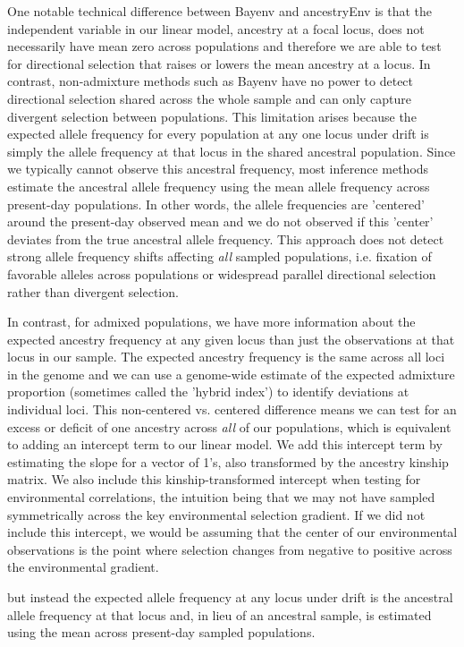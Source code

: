 \documentclass[12pt]{report}
\begin{document}
One notable technical difference between Bayenv and ancestryEnv is that the independent variable in our linear model, ancestry at a focal locus, does not necessarily have mean zero across populations and therefore we are able to test for directional selection that raises or lowers the mean ancestry at a locus. In contrast, non-admixture methods such as Bayenv have no power to detect directional selection shared across the whole sample and can only capture divergent selection between populations. This limitation arises because the expected allele frequency for every population at any one locus under drift is simply the allele frequency at that locus in the shared ancestral population. Since we typically cannot observe this ancestral frequency, most inference methods estimate the ancestral allele frequency using the mean allele frequency across present-day populations. In other words, the allele frequencies are 'centered' around the present-day observed mean and we do not observed if this 'center' deviates from the true ancestral allele frequency. This approach does not detect strong allele frequency shifts affecting \textit{all} sampled populations, i.e. fixation of favorable alleles across populations or widespread parallel directional selection rather than divergent selection.

In contrast, for admixed populations, we have more information about the expected ancestry frequency at any given locus than just the observations at that locus in our sample. The expected ancestry frequency is the same across all loci in the genome and we can use a genome-wide estimate of the expected admixture proportion (sometimes called the 'hybrid index') to identify deviations at individual loci. This non-centered vs. centered difference means we can test for an excess or deficit of one ancestry across \textit{all} of our populations, which is equivalent to adding an intercept term to our linear model. We add this intercept term by estimating the slope for a vector of 1's, also transformed by the ancestry kinship matrix. We also include this kinship-transformed intercept when testing for environmental correlations, the intuition being that we may not have sampled symmetrically across the key environmental selection gradient. If we did not include this intercept, we would be assuming that the center of our environmental observations is the point where selection changes from negative to positive across the environmental gradient.

but instead the expected allele frequency at any locus under drift is the ancestral allele frequency at that locus and, in lieu of an ancestral sample, is estimated using the mean across present-day sampled populations. 
\end{document}
